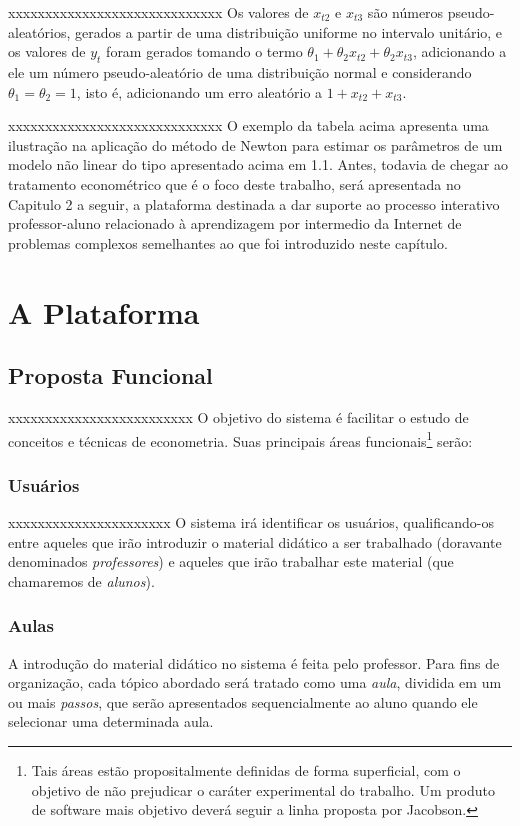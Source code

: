 \documentclass{abnt}
\begin{document}
xxxxxxxxxxxxxxxxxxxxxxxxxxxxx
	Os valores de $x_{t2}$ e $x_{t3}$ são números pseudo-aleatórios, gerados a partir de uma distribuição uniforme no intervalo unitário, e os valores de $y_t$ foram gerados tomando o termo $\theta_1 + \theta_2x_{t2}+\theta_2x_{t3}$, adicionando a ele um número pseudo-aleatório de uma distribuição normal e considerando $\theta_1 = \theta_2 = 1$, isto é, adicionando um erro aleatório a $1+x_{t2}+x_{t3}$.






xxxxxxxxxxxxxxxxxxxxxxxxxxxxx
	O exemplo da tabela acima apresenta uma ilustração na aplicação do método de Newton para estimar os parâmetros de um modelo não linear do tipo apresentado acima em 1.1. Antes, todavia de chegar ao tratamento econométrico que é o foco deste trabalho, será apresentada no Capitulo 2 a seguir, a plataforma destinada a dar suporte ao processo interativo professor-aluno relacionado à aprendizagem por intermedio da Internet de problemas complexos semelhantes ao que foi introduzido neste capítulo.



\chapter {A Plataforma}

\section{Proposta Funcional}

xxxxxxxxxxxxxxxxxxxxxxxxx
	O objetivo do sistema é facilitar o estudo de conceitos e técnicas de econometria. Suas principais áreas funcionais\footnote{Tais áreas estão propositalmente definidas de forma superficial, com o objetivo de não prejudicar o caráter experimental do trabalho. Um produto de software mais objetivo deverá seguir a linha proposta por Jacobson\cite{Jacobson}.} serão:

\subsection{Usuários}

xxxxxxxxxxxxxxxxxxxxxx
	O sistema irá identificar os usuários, qualificando-os entre aqueles que irão introduzir o material didático a ser trabalhado (doravante denominados \textit{professores}) e aqueles que irão trabalhar este material (que chamaremos de \textit{alunos}).
\subsection{Aulas}
	A introdução do material didático no sistema é feita pelo professor. Para fins de organização, cada tópico abordado será tratado como uma \textit{aula}, dividida em um ou mais \textit{passos}, que serão apresentados sequencialmente ao aluno quando ele selecionar uma determinada aula.
\end{document}
